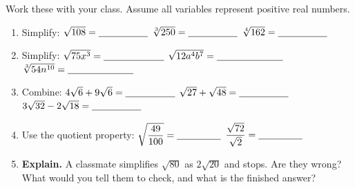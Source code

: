 \documentclass[10pt]{article}
\begin{document}
\begin{practicebox}
Work these with your class. Assume all variables represent positive real numbers.
\begin{enumerate}[leftmargin=1.7em, itemsep=5pt]
  \item Simplify: \; $\sqrt{108}=\blank{1.8cm}$ \quad $\sqrt[3]{250}=\blank{1.8cm}$ \quad
        $\sqrt[4]{162}=\blank{1.8cm}$
  \item Simplify: \; $\sqrt{75x^{3}}=\blank{2.2cm}$ \quad $\sqrt{12a^{4}b^{7}}=\blank{2.4cm}$ \quad
        $\sqrt[3]{54n^{10}}=\blank{2.4cm}$
  \item Combine: \; $4\sqrt6+9\sqrt6=\blank{1.8cm}$ \quad $\sqrt{27}+\sqrt{48}=\blank{1.8cm}$ \quad
        $3\sqrt{32}-2\sqrt{18}=\blank{1.8cm}$
  \item Use the quotient property: \; $\sqrt{\dfrac{49}{100}}=\blank{1.6cm}$ \quad
        $\dfrac{\sqrt{72}}{\sqrt{2}}=\blank{1.6cm}$
  \item \textbf{Explain.} A classmate simplifies $\sqrt{80}$ as $2\sqrt{20}$ and stops. Are they
        wrong? What would you tell them to check, and what is the finished answer? 
\end{enumerate}
\end{practicebox}
\end{document}

